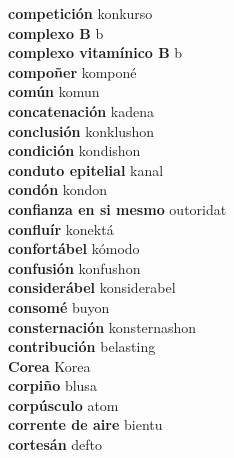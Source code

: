 \textbf{ competición  } konkurso \\
\textbf{ complexo B  } b \\
\textbf{ complexo vitamínico B  } b \\
\textbf{ compoñer  } komponé \\
\textbf{ común  } komun \\
\textbf{ concatenación  } kadena \\
\textbf{ conclusión  } konklushon \\
\textbf{ condición  } kondishon \\
\textbf{ conduto epitelial  } kanal \\
\textbf{ condón  } kondon \\
\textbf{ confianza en si mesmo  } outoridat \\
\textbf{ confluír  } konektá \\
\textbf{ confortábel  } kómodo \\
\textbf{ confusión  } konfushon \\
\textbf{ considerábel  } konsiderabel \\
\textbf{ consomé  } buyon \\
\textbf{ consternación  } konsternashon \\
\textbf{ contribución  } belasting \\
\textbf{ Corea  } Korea \\
\textbf{ corpiño  } blusa \\
\textbf{ corpúsculo  } atom \\
\textbf{ corrente de aire  } bientu \\
\textbf{ cortesán  } defto \\
